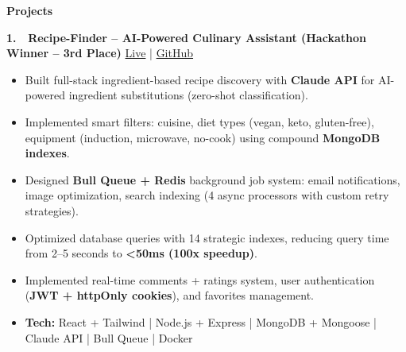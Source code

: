 \documentclass[9pt,a4paper]{article}
\begin{document}
\begin{tcolorbox}[enhanced,sharp corners,colback=white,boxrule=0pt,frame hidden,
borderline south={0.9pt}{0pt}{black!50}]
\textbf{Projects}
\vspace{-0.3ex}

\textbf{1. 🍳 Recipe-Finder – AI-Powered Culinary Assistant (Hackathon Winner – 3rd Place)} \hfill
\href{https://recipe-finder-live.vercel.app}{Live} | 
\href{https://github.com/hanuman2005/recipe-finder}{GitHub}
\begin{itemize}[topsep=1pt]
  \item Built full-stack ingredient-based recipe discovery with \textbf{Claude API} for AI-powered ingredient substitutions (zero-shot classification).
  \item Implemented smart filters: cuisine, diet types (vegan, keto, gluten-free), equipment (induction, microwave, no-cook) using compound \textbf{MongoDB indexes}.
  \item Designed \textbf{Bull Queue + Redis} background job system: email notifications, image optimization, search indexing (4 async processors with custom retry strategies).
  \item Optimized database queries with 14 strategic indexes, reducing query time from 2–5 seconds to \textbf{<50ms (100x speedup)}.
  \item Implemented real-time comments + ratings system, user authentication (\textbf{JWT + httpOnly cookies}), and favorites management.
  \item \textbf{Tech:} React + Tailwind | Node.js + Express | MongoDB + Mongoose | Claude API | Bull Queue | Docker
\end{itemize} \vspace{0.3ex}


\end{tcolorbox}
\end{document}
